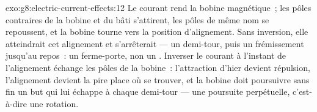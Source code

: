 \begin{solution}{exo:g8:electric-current-effects:12}
Le courant rend la bobine magnétique~; les pôles contraires de la
bobine et du bâti s'attirent, les pôles de même nom se repoussent, et
la bobine tourne vers la position d'alignement. Sans inversion, elle
atteindrait cet alignement et s'arrêterait --- un demi-tour, puis un
frémissement jusqu'au repos~: un ferme-porte, non un . Inverser
le courant à l'instant de l'alignement échange les pôles de la
bobine~: l'attraction d'hier devient répulsion, l'alignement devient
la pire place où se trouver, et la bobine doit poursuivre sans fin un
but qui lui échappe à chaque demi-tour --- une poursuite perpétuelle,
c'est-à-dire une rotation.
\end{solution}

